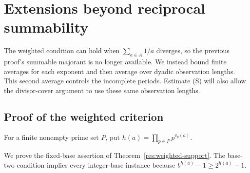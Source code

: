 \documentclass[11pt]{article}
\begin{document}
\section{Extensions beyond reciprocal summability}
\label{sec:eight-return-extensions}

The weighted condition can hold when $\sum_{a\in A}1/a$ diverges, so the
previous proof's summable majorant is no longer available.  We instead
bound finite averages for each exponent and then average over dyadic
observation lengths.  This second average controls the incomplete periods.
Estimate (S) will also allow the divisor-cover argument to use these same
observation lengths.

\subsection{Proof of the weighted criterion}
For a finite nonempty prime set $P$, put
$h(a)=\prod_{p\in P}p^{v_p(a)}$.

We prove the fixed-base assertion of Theorem~\ref{res:weighted-support}.
The base-two condition implies every integer-base instance because
$b^{h(a)}-1\ge2^{h(a)}-1$.
\end{document}
